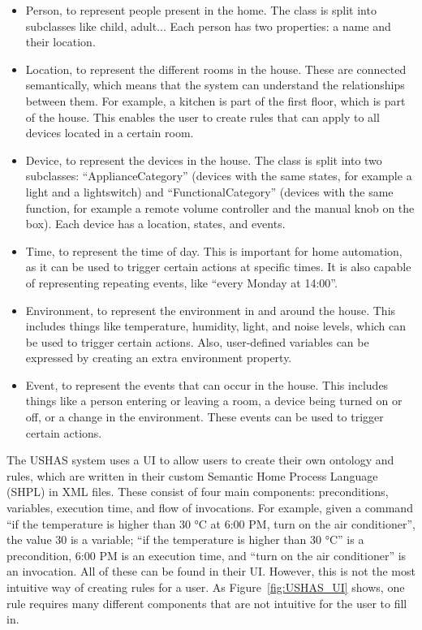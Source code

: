 \documentclass[11pt,a4paper]{report}
\begin{document}
\begin{itemize} 
    \item Person, to represent people present in the home. The class is split into subclasses like child, adult... Each person has two properties: a name and their location. 
    \item Location, to represent the different rooms in the house. These are connected semantically, which means that the system can understand the relationships between them. For example, a kitchen is part of the first floor, which is part of the house. This enables the user to create rules that can apply to all devices located in a certain room. 
    \item Device, to represent the devices in the house. The class is split into two subclasses: ``ApplianceCategory'' (devices with the same states, for example a light and a lightswitch) and ``FunctionalCategory'' (devices with the same function, for example a remote volume controller and the manual knob on the box). Each device has a location, states, and events. 
    \item Time, to represent the time of day. This is important for home automation, as it can be used to trigger certain actions at specific times. It is also capable of representing repeating events, like ``every Monday at 14:00''. 
    \item Environment, to represent the environment in and around the house. This includes things like temperature, humidity, light, and noise levels, which can be used to trigger certain actions. Also, user-defined variables can be expressed by creating an extra environment property. 
    \item Event, to represent the events that can occur in the house. This includes things like a person entering or leaving a room, a device being turned on or off, or a change in the environment. These events can be used to trigger certain actions. 
\end{itemize}

The USHAS system uses a UI to allow users to create their own ontology and rules, which are written in their custom Semantic Home Process Language (SHPL) in XML files. These consist of four main components: preconditions, variables, execution time, and flow of invocations. For example, given a command ``if the temperature is higher than 30 °C at 6:00 PM, turn on the air conditioner'', the value 30 is a variable; ``if the temperature is higher than 30 °C'' is a precondition, 6:00 PM is an execution time, and ``turn on the air conditioner'' is an invocation. All of these can be found in their UI. However, this is not the most intuitive way of creating rules for a user. As Figure~\ref{fig:USHAS_UI} shows, one rule requires many different components that are not intuitive for the user to fill in.
\end{document}
